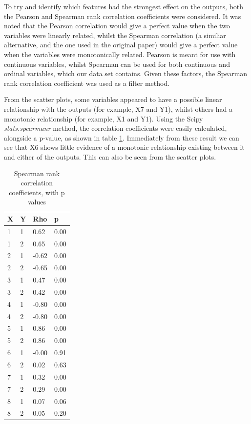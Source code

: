\documentclass[12pt]{article}
\begin{document}
To try and identify which features had the strongest effect on the outputs, both the Pearson and Spearman rank correlation coefficients were considered. It was noted that the Pearson correlation would give a perfect value when the two variables were linearly related, whilst the Spearman correlation (a similiar alternative, and the one used in the original paper) would give a perfect value when the variables were monotonically related. Pearson is meant for use with continuous variables, whilst Spearman can be used for both continuous and ordinal variables, which our data set contains. Given these factors, the Spearman rank correlation coefficient was used as a filter method.

From the scatter plots, some variables appeared to have a possible linear relationship with the outputs (for example, X7 and Y1), whilst others had a monotonic relationship (for example, X1 and Y1). Using the Scipy \emph{stats.spearmanr} method, the correlation coefficients were easily calculated, alongside a p-value, as shown in table \ref{tbl:spearman-table}. Immediately from these result we can see that X6 shows little evidence of a monotonic relationship existing between it and either of the outputs. This can also be seen from the scatter plots.


\begin{table}[!ht]
\centering
\caption{Spearman rank correlation coefficients, with p values}
\label{tbl:spearman-table}
\begin{tabular}{||llll||}
\hline
X    				& Y & Rho   & p    \\
\hline
1                   & 1 & 0.62  & 0.00 \\
1                   & 2 & 0.65  & 0.00 \\
2                   & 1 & -0.62 & 0.00 \\
2                   & 2 & -0.65 & 0.00 \\
3                   & 1 & 0.47  & 0.00 \\
3                   & 2 & 0.42  & 0.00 \\
4                   & 1 & -0.80 & 0.00 \\
4                   & 2 & -0.80 & 0.00 \\
5                   & 1 & 0.86  & 0.00 \\
5                   & 2 & 0.86  & 0.00 \\
6                   & 1 & -0.00 & 0.91 \\
6                   & 2 & 0.02  & 0.63 \\
7                   & 1 & 0.32  & 0.00 \\
7                   & 2 & 0.29  & 0.00 \\
8                   & 1 & 0.07  & 0.06 \\
8                   & 2 & 0.05  & 0.20 \\
\hline
\end{tabular}
\end{table}
\end{document}
